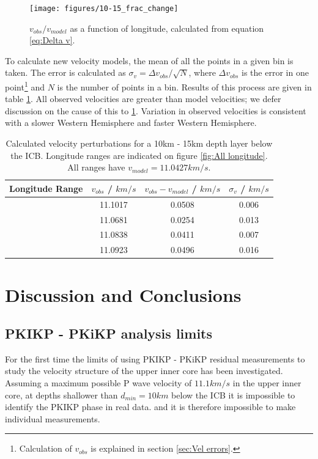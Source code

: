 \documentclass[11pt,a4paper]{article}
\begin{document}
\begin{figure}
	\centering
	\texttt{[image: figures/10-15\_frac\_change]}
	\caption{$v_{obs} / v_{model}$ as a function of longitude, calculated from equation \eqref{eq:Delta v}.}
	\label{fig:Frac change}
\end{figure}

To calculate new velocity models, the mean of all the points in a given bin is taken. The error is calculated as $\sigma_{v} = \Delta v_{obs}/\sqrt{N}$, where $\Delta v_{obs}$ is the error in one point\footnote{Calculation of $v_{obs}$ is explained in section \ref{sec:Vel errors}.} and $N$ is the number of points in a bin. Results of this process are given in table \ref{tab:Velocity models}. All observed velocities are greater than model velocities; we defer discussion on the cause of this to \ref{sec:Discussion}. Variation in observed velocities is consistent with a slower Western Hemisphere and faster Western Hemisphere.

\begin{table}
\centering
\begin{tabular}{| c | c | c | c |}
	\hline
	Longitude Range			& $v_{obs}$ / $km/s$	& $v_{obs} - v_{model}$ / $km/s$	& $\sigma_{v}$ / $km/s$	\\ \hline \hline
	[$150^{\circ}$, $-170^{\circ}$]	& 11.1017				& 0.0508						& 0.006				\\ \hline
	[$-90^{\circ}$, $-75^{\circ}$]	& 11.0681				& 0.0254						& 0.013				\\ \hline
	[$-30^{\circ}$, $0^{\circ}$]		& 11.0838				& 0.0411						& 0.007				\\ \hline
	[$0^{\circ}$, $60^{\circ}$]		& 11.0923				& 0.0496						& 0.016				\\
	\hline
\end{tabular}
\caption{Calculated velocity perturbations for a 10km - 15km depth layer below the ICB. Longitude ranges are indicated on figure \ref{fig:All longitude}. All ranges have $v_{model} = 11.0427 km/s$.}
\label{tab:Velocity models}
\end{table}

\section{Discussion and Conclusions}
\label{sec:Discussion}

\subsection{PKIKP - PKiKP analysis limits}
For the first time the limits of using PKIKP - PKiKP residual measurements to study the velocity structure of the upper inner core has been investigated. Assuming a maximum possible P wave velocity of $11.1 km/s$ in the upper inner core, at depths shallower than $d_{min} = 10km$ below the ICB it is impossible to identify the PKIKP phase in real data. and it is therefore impossible to make individual measurements.
\end{document}
